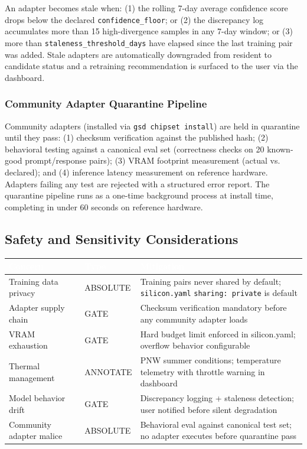 \documentclass[11pt,letterpaper]{article}
\newcommand{\tableheader}[1]{\textbf{\sffamily\textcolor{white}{#1}}}
\begin{document}
An adapter becomes stale when: (1) the rolling 7-day average confidence score drops below the declared \texttt{confidence\_floor}; or (2) the discrepancy log accumulates more than 15 high-divergence samples in any 7-day window; or (3) more than \texttt{staleness\_threshold\_days} have elapsed since the last training pair was added. Stale adapters are automatically downgraded from resident to candidate status and a retraining recommendation is surfaced to the user via the dashboard.

\subsubsection{Community Adapter Quarantine Pipeline}

Community adapters (installed via \texttt{gsd chipset install}) are held in quarantine until they pass: (1) checksum verification against the published hash; (2) behavioral testing against a canonical eval set (correctness checks on 20 known-good prompt/response pairs); (3) VRAM footprint measurement (actual vs. declared); and (4) inference latency measurement on reference hardware. Adapters failing any test are rejected with a structured error report. The quarantine pipeline runs as a one-time background process at install time, completing in under 60 seconds on reference hardware.

\subsection{Safety and Sensitivity Considerations}

\begin{center}
\begin{tabularx}{\textwidth}{L{3.5cm}L{2cm}X}
\toprule
{}
\tableheader{Concern} & \tableheader{Type} & \tableheader{Mitigation} \\
\midrule
Training data privacy & ABSOLUTE & Training pairs never shared by default; \texttt{silicon.yaml} \texttt{sharing: private} is default \\
Adapter supply chain & GATE & Checksum verification mandatory before any community adapter loads \\
VRAM exhaustion & GATE & Hard budget limit enforced in silicon.yaml; overflow behavior configurable \\
Thermal management & ANNOTATE & PNW summer conditions; temperature telemetry with throttle warning in dashboard \\
Model behavior drift & GATE & Discrepancy logging + staleness detection; user notified before silent degradation \\
Community adapter malice & ABSOLUTE & Behavioral eval against canonical test set; no adapter executes before quarantine pass \\
\bottomrule
\end{tabularx}
\end{center}
\end{document}
